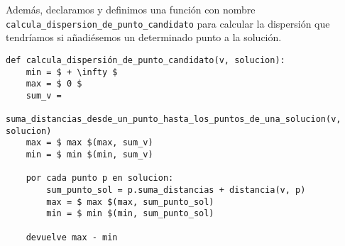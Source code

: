 Además, declaramos y definimos una función con nombre \texttt{calcula\_dispersion\_de\_punto\_candidato} para calcular
la dispersión que tendríamos si añadiésemos un determinado punto a la solución.

\begin{minipage}{\textwidth}
\begin{lstlisting}[mathescape=true,caption={Definición de la función que nos permite calcular la dispersión de un punto candidato si perteneciese a una solución.},captionpos=b]
def calcula_dispersión_de_punto_candidato(v, solucion):
    min = $ + \infty $
    max = $ 0 $
    sum_v =
        suma_distancias_desde_un_punto_hasta_los_puntos_de_una_solucion(v, solucion)
    max = $ max $(max, sum_v)
    min = $ min $(min, sum_v)

    por cada punto p en solucion:
        sum_punto_sol = p.suma_distancias + distancia(v, p)
        max = $ max $(max, sum_punto_sol)
        min = $ min $(min, sum_punto_sol)
    
    devuelve max - min
\end{lstlisting}
\end{minipage}